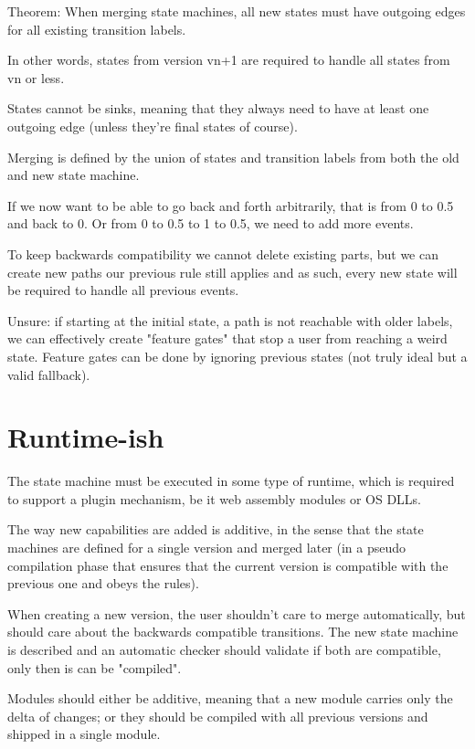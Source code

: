\documentclass[a4paper]{article}
\begin{document}
Theorem: When merging state machines, all new states must have outgoing edges for all existing transition labels.

In other words, states from version vn+1 are required to handle all states from vn or less.

States cannot be sinks, meaning that they always need to have at least one outgoing edge (unless they're final states of course).


Merging is defined by the union of states and transition labels from both the old and new state machine.

If we now want to be able to go back and forth arbitrarily, that is from 0 to 0.5 and back to 0.
Or from 0 to 0.5 to 1 to 0.5, we need to add more events.

To keep backwards compatibility we cannot delete existing parts, but we can create new paths
our previous rule still applies and as such, every new state will be required to handle all previous events.

Unsure: if starting at the initial state, a path is not reachable with older labels,
we can effectively create "feature gates" that stop a user from reaching a weird state.
Feature gates can be done by ignoring previous states (not truly ideal but a valid fallback).


\section*{Runtime-ish}

The state machine must be executed in some type of runtime, which is required to support
a plugin mechanism, be it web assembly modules or OS DLLs.

The way new capabilities are added is additive, in the sense that the state machines are defined
for a single version and merged later (in a pseudo compilation phase that ensures that the current version
is compatible with the previous one and obeys the rules).

When creating a new version, the user shouldn't care to merge automatically, but should care about the
backwards compatible transitions.
The new state machine is described and an automatic checker should validate if both are
compatible, only then is can be "compiled".

Modules should either be additive, meaning that a new module carries only the delta of changes;
or they should be compiled with all previous versions and shipped in a single module.


\end{document}

